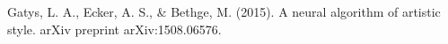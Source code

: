 \documentclass[9pt]{beamer}
\begin{document}
\begin{frame}
\begin{center}
  \end{center}

  \bigskip

  {\footnotesize Gatys, L. A., Ecker, A. S., \& Bethge, M. (2015). A
    neural algorithm of artistic style. arXiv preprint
    arXiv:1508.06576.}

\end{frame}
\end{document}
